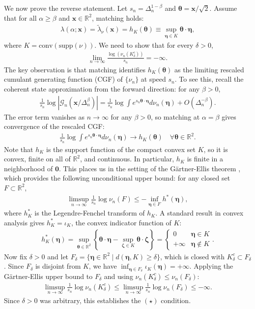 \documentclass[a4paper,11pt]{article}
\theoremstyle{plain}
\theoremstyle{definition}
\theoremstyle{remark}
\newcommand{\bs}[1]{\boldsymbol{#1}}
\newcommand{\ba}{\begin{equation} \begin{aligned}}
\newcommand{\ea}{\end{aligned} \end{equation}}
\newcommand{\De}{\Delta}
\begin{document}
\begin{appendix}
We now prove the reverse statement.  Let $s_n = \De_n^{1-\beta}$ and $\bs{\theta} = \bs{x}/\sqrt{2}$. Assume that for all $\alpha \geq \beta$ and $\bs{x} \in \mathbb{R}^2$, matching holds:
\ba
\lambda(\alpha;\bs{x}) = \tilde{\lambda}_\nu(\bs{x}) = h_K(\bs{\theta}) \equiv \sup_{\bs{\eta}\in K}\bs{\theta}\cdot\bs{\eta},
\ea
where $K = \mathrm{conv}(\mathrm{supp}(\nu))$. We need to show that for every $\delta>0$,
\ba
\lim_{n\to\infty}\frac{\log(\nu_n(K_\delta^c))}{s_n} = -\infty.
\ea
The key observation is that matching identifies $h_K(\bs{\theta})$ as the limiting rescaled cumulant generating function (CGF) of $\{\nu_n\}$ at speed $s_n$. To see this, recall the coherent state approximation from the forward direction: for any $\beta>0$,
\ba
\frac{1}{s_n}\log|\mathcal{G}_n(\bs{x}/\De_n^\beta)| = \frac{1}{s_n}\log\int e^{s_n \bs{\theta}\cdot\bs{\eta}}d\nu_n(\bs{\eta}) + O(\De_n^{-\beta}).
\ea
The error term vanishes as $n \to \infty$ for any $\beta > 0$, so matching at $\alpha = \beta$ gives convergence of the rescaled CGF:
\ba
\label{rescaledCGFconvergence}
\frac{1}{s_n}\log\int e^{s_n\bs{\theta}\cdot\bs{\eta}}d\nu_n(\bs{\eta}) \to h_K(\bs{\theta}) \quad \forall \bs{\theta}\in\mathbb{R}^2.
\ea
Note that $h_K$ is the support function of the compact convex set $K$, so it is convex, finite on all of $\mathbb{R}^2$, and continuous. In particular, $h_K$ is finite in a neighborhood of $\bs{0}$. This places us in the setting of the G\"artner-Ellis theorem \cite{DemboZeitouni1998}, which provides the following unconditional upper bound: for any closed set $F\subset\mathbb{R}^2$,
\ba
\limsup_{n\to\infty}\frac{1}{s_n}\log\nu_n(F) \leq - \inf_{\bs{\eta}\in F} h^*(\bs{\eta}),
\ea
where $h_K^*$ is the Legendre-Fenchel transform of $h_K$. A standard result in convex analysis gives $h_K^* = \iota_K$, the convex indicator function of $K$:
\ba
h_K^*(\bs{\eta}) = \sup_{\bs{\theta}\in\mathbb{R}^2}\left\{\bs{\theta}\cdot\bs{\eta} - \sup_{\bs{\zeta}\in K}\bs{\theta}\cdot\bs{\zeta}\right\} = \begin{cases}0 & \bs{\eta}\in K \\ +\infty & \bs{\eta}\notin K\end{cases}.
\ea
Now fix $\delta > 0$ and let $F_\delta = \{\bs{\eta}\in\mathbb{R}^2\mid d(\bs{\eta},K)\geq \delta\}$, which is closed with $K_\delta^c \subset F_\delta$. Since $F_\delta$ is disjoint from $K$, we have $\inf_{\bs{\eta}\in F_\delta}\iota_K(\bs{\eta}) = +\infty$. Applying the G\"artner-Ellis upper bound to $F_\delta$ and using $\nu_n(K_\delta^c)\leq \nu_n(F_\delta)$:
\ba
\limsup_{n\to\infty} \frac{1}{s_n}\log\nu_n(K_\delta^c) \leq \limsup_{n\to\infty} \frac{1}{s_n}\log\nu_n(F_\delta) \leq -\infty.
\ea
Since $\delta > 0$ was arbitrary, this establishes the $(\star)$ condition.


\end{appendix}
\end{document}

